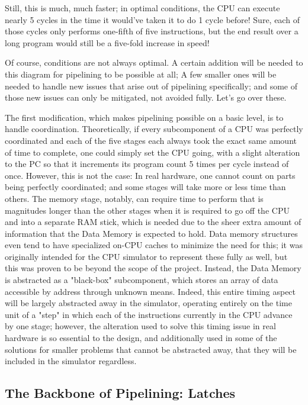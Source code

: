 \documentclass[12pt,twoside]{reedthesis}
\begin{document}
Still, this is much, much faster;  in optimal conditions, the CPU can execute nearly 5 cycles in the time it would've taken it to do 1 cycle before! Sure, each of those cycles only performs one-fifth of five instructions, but the end result over a long program would still be a five-fold increase in speed!

Of course, conditions are not always optimal. A certain addition will be needed to this diagram for pipelining to be possible at all; A few smaller ones will be needed to handle new issues that arise out of pipelining specifically; and some of those new issues can only be mitigated, not avoided fully. Let's go over these.

The first modification, which makes pipelining possible on a basic level, is to handle coordination. Theoretically, if  every subcomponent of a CPU was perfectly coordinated and each of the five stages each always took the exact same amount of time to complete, one could simply set the CPU going, with a slight alteration to the PC so that it increments its program count 5 times per cycle instead of once. However, this is not the case: In real hardware, one cannot count on parts being perfectly coordinated; and some stages will take more or less time than others. The memory stage, notably, can require time to perform that is magnitudes longer than the other stages when it is required to go off the CPU and into a separate RAM stick, which is needed due to the sheer extra amount of information that the Data Memory is expected to hold. Data memory structures even tend to have specialized on-CPU caches to minimize the need for this; it was originally intended for the CPU simulator to represent these fully as well, but this was proven to be beyond the scope of the project. Instead, the Data Memory is abstracted as a "black-box" subcomponent, which stores an array of data accessible by address through unknown means. Indeed, this entire timing aspect will be largely abstracted away in the simulator, operating entirely on the time unit of a "step" in which each of the instructions currently in the CPU advance by one stage; however, the alteration used to solve this timing issue in real hardware is so essential to the design, and additionally used in some of the solutions for smaller problems that cannot be abstracted away, that they will be included in the simulator regardless.

\subsection{The Backbone of Pipelining: Latches}
\end{document}

